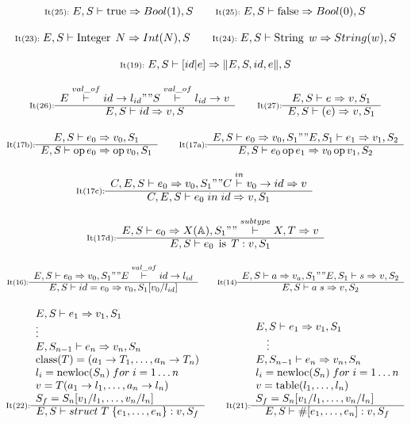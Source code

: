 {
\footnotesize
\[
\textnormal{{\scriptsize It(25):}}\; E, S\vdash\operatorname{true}\Rightarrow Bool(1),S
\quad\quad
\textnormal{{\scriptsize It(25):}}\; E, S\vdash\operatorname{false}\Rightarrow Bool(0),S
\]

\[
\textnormal{{\scriptsize It(23):}}\; E, S\vdash\operatorname{Integer}\; N\Rightarrow Int(N),S
\quad\quad
\textnormal{{\scriptsize It(24):}}\; E, S\vdash\operatorname{String}\; w\Rightarrow String(w),S
\]

\[
\textnormal{{\scriptsize It(19):}}\; E, S\vdash \left[id \vert e \right] \Rightarrow \lVert E,S, id, e\rVert,S
\]

\[
\inference[It(26):]{
E\overset{val\_of}{|-}id->l_{id} "" S\overset{val\_of}{|-}l_{id}->v
}{E, S|-id=>v,S}
\quad\quad
\inference[It(27):]{
E, S|-e=>v,S_1
}
{E, S|-(e)=>v,S_1}
\]

\[
\inference[It(17b):]{
E, S|-e_0=>v_0,S_1
}{E, S|-\operatorname{op}e_0=>\operatorname{op}v_0,S_1}
\quad\quad
\inference[It(17a):]{
E, S|-e_0=>v_0,S_1 "" E, S_1|-e_1=>v_1,S_2
}{E, S|-e_0\operatorname{op}e_1=>v_0\operatorname{op}v_1,S_2}
\]

\[
\inference[It(17c):]{
C, E, S|-e_0=>v_0,S_1 "" C \overset {in} {|-} v_0->id =>v
}{C, E, S|-e_0 \; in \; id=>v,S_1}
\quad\quad
\]

\[
\inference[It(17d):]{
E, S|-e_0=>X(\mathbb{A}),S_1 "" \overset{subtype}{|-} X, T \Rightarrow v
}{E, S|-e_0\; \operatorname{is} \; T:v,S_1}
\]

\[
\inference[It(16):]
{
E,S|-e_0=>v_0,S_1 "" E\overset{val\_of}{|-}id->l_{id}
}
{E, S|-id = e_0=>v_0, S_1[v_0/l_{id}]}
\quad\quad
\inference[It(14)]
{
E, S|-a=>v_a,S_1 "" E, S_1|-s=>v,S_2
}
{E, S|-a\;s=>v,S_2}
\]

\[
\inference[It(22):]
{
E,S|-e_1=>v_1,S_1 \\
\vdots \\
E,S_{n-1}|-e_n=>v_n,S_n \\
\operatorname{class}(T)=(a_1->T_1, \dots, a_n->T_n) \\  %
l_i = \operatorname{newloc}(S_n) \; for \; i = 1 \dots n \\
v=T(a_1->l_1, \dots, a_n->l_n) \\ %
S_f = S_n[v_1/l_1, \dots, v_n/l_n]
}
{E, S|-struct\;T\;\{ e_1, \ldots, e_n \}:v,S_f}
\quad\quad
\inference[It(21):]
{
E,S|-e_1=>v_1,S_1 \\
\quad \vdots \\
E,S_{n-1}|-e_n=>v_n,S_n \\
l_i = \operatorname{newloc}(S_n) \; for \; i = 1 \dots n \\
v=\operatorname{table}(l_1, \dots, l_n) \\
S_f = S_n[v_1/l_1, \dots, v_n/l_n]
}
{E, S|-\#[e_1, \dots, e_n]:v,S_f}
\]

}
